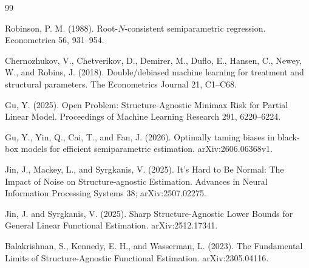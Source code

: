 \documentclass{article}
\begin{document}
\begin{thebibliography}{99}

   Robinson, P. M. (1988). Root-\(N\)-consistent semiparametric regression. Econometrica 56, 931--954.

   Chernozhukov, V., Chetverikov, D., Demirer, M., Duflo, E., Hansen, C., Newey, W., and Robins, J. (2018). Double/debiased machine learning for treatment and structural parameters. The Econometrics Journal 21, C1--C68.

   Gu, Y. (2025). Open Problem: Structure-Agnostic Minimax Risk for Partial Linear Model. Proceedings of Machine Learning Research 291, 6220--6224.

   Gu, Y., Yin, Q., Cai, T., and Fan, J. (2026). Optimally taming biases in black-box models for efficient semiparametric estimation. arXiv:2606.06368v1.

   Jin, J., Mackey, L., and Syrgkanis, V. (2025). It's Hard to Be Normal: The Impact of Noise on Structure-agnostic Estimation. Advances in Neural Information Processing Systems 38; arXiv:2507.02275.

   Jin, J. and Syrgkanis, V. (2025). Sharp Structure-Agnostic Lower Bounds for General Linear Functional Estimation. arXiv:2512.17341.

   Balakrishnan, S., Kennedy, E. H., and Wasserman, L. (2023). The Fundamental Limits of Structure-Agnostic Functional Estimation. arXiv:2305.04116.

\end{thebibliography}
\end{document}
